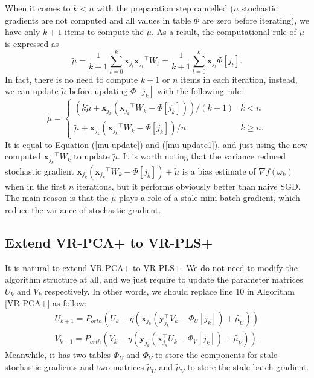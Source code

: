 \documentclass[runningheads,a4paper]{llncs}
\begin{document}
 
 
 When it comes to $k<n$ with the preparation step cancelled ($n$ stochastic gradients are not computed and all values in table $\Phi$ are zero before iterating), we have only $k+1$ items to compute the $\tilde{\mu}$. As a result, the computational rule of $\tilde{\mu}$ is expressed as 
  \begin{equation}
 \label{mu-update}
 \tilde{\mu} = \frac{1}{k+1}\sum\limits_{t=0}^{k}\mathbf{x}_{j_t}{\mathbf{x}_{j_t}}^{\top}W_t =  \frac{1}{k+1} \sum\limits_{t=0}^{k}\mathbf{x}_{j_t}\Phi[j_t].
 \end{equation}
 In fact, there is no need to compute $k+1$ or $n$ items in each iteration, instead, we can update $\tilde{\mu}$ before updating $\Phi[j_k]$ with the following rule:
  \begin{equation}
 \label{mu-update1}
 \tilde{\mu} = 
 \begin{cases}
 (k\tilde{\mu} + \mathbf{x}_{j_k}({\mathbf{x}_{j_k}}^{\top}W_k - \Phi[j_k]))/(k+1) &k<n\\
 \tilde{\mu} + \mathbf{x}_{j_k}({\mathbf{x}_{j_k}}^{\top}W_k - \Phi[{j_k}])/n &k \geqslant n.
 \end{cases}
 \end{equation}
 It is equal to Equation (\ref{mu-update}) and (\ref{mu-update1}), and just using the new computed ${\mathbf{x}_{j_k}}^{\top}W_k$ to update $\tilde{\mu}$.
 It is worth noting that the variance reduced stochastic gradient $\mathbf{x}_{j_k}({\mathbf{x}_{j_k}}^{\top}W_k - \Phi[{j_k}]) + \tilde{\mu}$ is a bias estimate of $\nabla f(\omega_k)$ when in the first $n$ iterations, but it performs obviously better than naive SGD. The main reason is that the $\tilde{\mu}$ plays a role of a stale mini-batch gradient, which reduce the variance of stochastic gradient.

\subsection{Extend VR-PCA+ to VR-PLS+}
It is natural to extend VR-PCA+ to VR-PLS+. 
We do not need to modify the algorithm structure at all, and we just require to update the parameter matrices $U_k$ and $V_k$ respectively. In other words, we should replace line 10 in Algorithm \ref{VR-PCA+} as follow:
 \begin{equation}
 \label{pls-update}
  \begin{split}
 U_{k+1} = P_{orth}(U_{k} - \eta(\mathbf{x}_{j_k}(\mathbf{y}_{j_k}^{{\top}}V_k - \Phi_U[{j_k}]) + \tilde{\mu_U}))\\
 V_{k+1} = P_{orth}(V_{k} - \eta(\mathbf{y}_{j_k}( \mathbf{x}_{j_k}^{{\top}}U_k - \Phi_V[{j_k}]) + \tilde{\mu_V})).
  \end{split}
 \end{equation}
 Meanwhile, it has two tables $\Phi_U$ and $\Phi_V$ to store the components for stale stochastic gradients and two matrices $\tilde{\mu}_{U}$ and $\tilde{\mu}_{V}$ to store the stale batch gradient.
\end{document}
